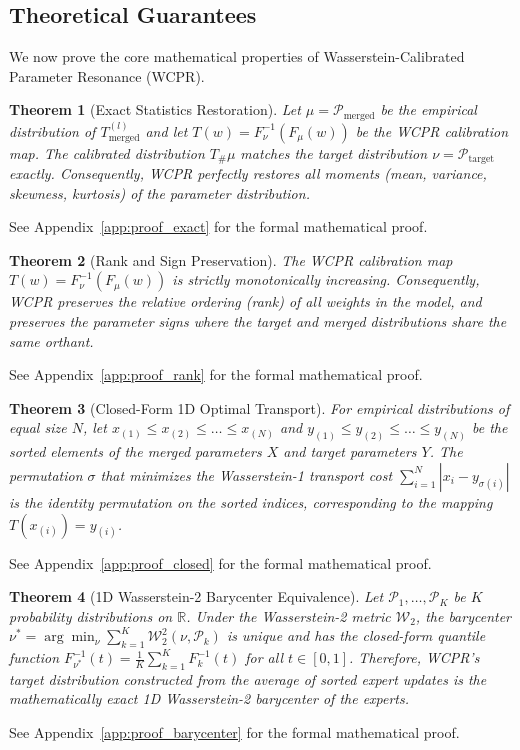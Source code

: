 \documentclass{article}
\theoremstyle{plain}
\newtheorem{theorem}{Theorem}[section]
\theoremstyle{definition}
\theoremstyle{remark}
\begin{document}
\subsection{Theoretical Guarantees}

We now prove the core mathematical properties of Wasserstein-Calibrated Parameter Resonance (WCPR).

\begin{theorem}[Exact Statistics Restoration]
\label{thm:exact}
  Let $\mu = \mathcal{P}_{\text{merged}}$ be the empirical distribution of $T^{(l)}_{\text{merged}}$ and let $T(w) = F_{\nu}^{-1}(F_{\mu}(w))$ be the WCPR calibration map. The calibrated distribution $T_\# \mu$ matches the target distribution $\nu = \mathcal{P}_{\text{target}}$ exactly. Consequently, WCPR perfectly restores all moments (mean, variance, skewness, kurtosis) of the parameter distribution.
\end{theorem}
See Appendix~\ref{app:proof_exact} for the formal mathematical proof.

\begin{theorem}[Rank and Sign Preservation]
\label{thm:rank}
  The WCPR calibration map $T(w) = F_{\nu}^{-1}(F_{\mu}(w))$ is strictly monotonically increasing. Consequently, WCPR preserves the relative ordering (rank) of all weights in the model, and preserves the parameter signs where the target and merged distributions share the same orthant.
\end{theorem}
See Appendix~\ref{app:proof_rank} for the formal mathematical proof.

\begin{theorem}[Closed-Form 1D Optimal Transport]
\label{thm:closed}
  For empirical distributions of equal size $N$, let $x_{(1)} \leq x_{(2)} \leq \dots \leq x_{(N)}$ and $y_{(1)} \leq y_{(2)} \leq \dots \leq y_{(N)}$ be the sorted elements of the merged parameters $X$ and target parameters $Y$. The permutation $\sigma$ that minimizes the Wasserstein-1 transport cost $\sum_{i=1}^N |x_i - y_{\sigma(i)}|$ is the identity permutation on the sorted indices, corresponding to the mapping $T(x_{(i)}) = y_{(i)}$.
\end{theorem}
See Appendix~\ref{app:proof_closed} for the formal mathematical proof.

\begin{theorem}[1D Wasserstein-2 Barycenter Equivalence]
\label{thm:barycenter}
  Let $\mathcal{P}_1, \dots, \mathcal{P}_K$ be $K$ probability distributions on $\mathbb{R}$. Under the Wasserstein-2 metric $\mathcal{W}_2$, the barycenter $\nu^* = \arg\min_{\nu} \sum_{k=1}^K \mathcal{W}_2^2(\nu, \mathcal{P}_k)$ is unique and has the closed-form quantile function $F_{\nu^*}^{-1}(t) = \frac{1}{K} \sum_{k=1}^K F_k^{-1}(t)$ for all $t \in [0, 1]$. Therefore, WCPR's target distribution constructed from the average of sorted expert updates is the mathematically exact 1D Wasserstein-2 barycenter of the experts.
\end{theorem}
See Appendix~\ref{app:proof_barycenter} for the formal mathematical proof.
\end{document}
